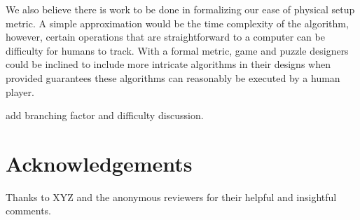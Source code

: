 \documentclass[10pt,journal,compsoc]{IEEEtran}
\begin{document}
We also believe there is work to be done in formalizing our ease of physical setup metric. A simple approximation would be the time complexity of the algorithm, however, certain operations that are straightforward to a computer can be difficulty for humans to track. With a formal metric, game and puzzle designers could be inclined to include more intricate algorithms in their designs when provided guarantees these algorithms can reasonably be executed by a human player.

add branching factor and difficulty discussion.

\section*{Acknowledgements}

\noindent
Thanks to XYZ and the anonymous reviewers for their helpful and insightful comments.


%
%

\end{document}
